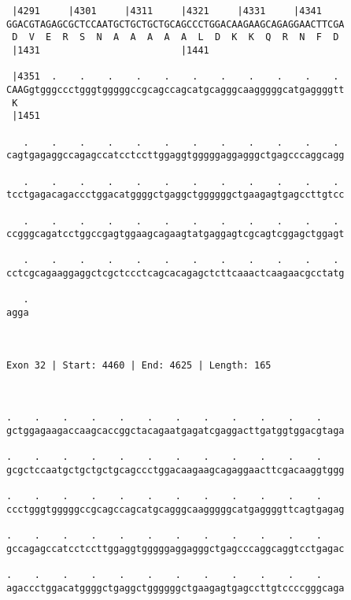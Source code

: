 \documentclass{article}
\begin{document}
\begin{Verbatim}
 |4291     |4301     |4311     |4321     |4331     |4341    
GGACGTAGAGCGCTCCAATGCTGCTGCTGCAGCCCTGGACAAGAAGCAGAGGAACTTCGA
 D  V  E  R  S  N  A  A  A  A  A  L  D  K  K  Q  R  N  F  D 
 |1431                         |1441                        
  
 |4351  .    .    .    .    .    .    .    .    .    .    . 
CAAGgtgggccctgggtgggggccgcagccagcatgcagggcaagggggcatgaggggtt
 K                                                          
 |1451                                                      
  
   .    .    .    .    .    .    .    .    .    .    .    . 
cagtgagaggccagagccatcctccttggaggtgggggaggagggctgagcccaggcagg
                                                            
   .    .    .    .    .    .    .    .    .    .    .    . 
tcctgagacagaccctggacatggggctgaggctggggggctgaagagtgagccttgtcc
                                                            
   .    .    .    .    .    .    .    .    .    .    .    . 
ccgggcagatcctggccgagtggaagcagaagtatgaggagtcgcagtcggagctggagt
                                                            
   .    .    .    .    .    .    .    .    .    .    .    . 
cctcgcagaaggaggctcgctccctcagcacagagctcttcaaactcaagaacgcctatg
                                                            
   .
agga
    
    
 
Exon 32 | Start: 4460 | End: 4625 | Length: 165



.    .    .    .    .    .    .    .    .    .    .    .    
gctggagaagaccaagcaccggctacagaatgagatcgaggacttgatggtggacgtaga
                                                            
.    .    .    .    .    .    .    .    .    .    .    .    
gcgctccaatgctgctgctgcagccctggacaagaagcagaggaacttcgacaaggtggg
                                                            
.    .    .    .    .    .    .    .    .    .    .    .    
ccctgggtgggggccgcagccagcatgcagggcaagggggcatgaggggttcagtgagag
                                                            
.    .    .    .    .    .    .    .    .    .    .    .    
gccagagccatcctccttggaggtgggggaggagggctgagcccaggcaggtcctgagac
                                                            
.    .    .    .    .    .    .    .    .    .    .    .    
agaccctggacatggggctgaggctggggggctgaagagtgagccttgtccccgggcaga
                                                            

\end{Verbatim}
\end{document}
